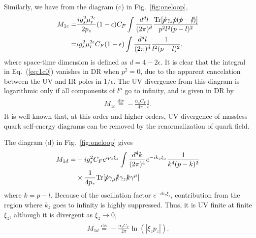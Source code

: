 Similarly, we have from the diagram (c) in Fig.~\ref{fig:oneloop},
\begin{align}\label{eq:1c0}
\begin{split}
M_{1c}=&\frac{i g_s^2 \mu_r^{2\epsilon}}{2p_z}(1-\epsilon)C_F\int\frac{d^dl}{(2\pi)^d} \frac{\text{Tr}[\slashed{p}\gamma_z {\slashed{p}}(\slashed{p}-\slashed{l})]}{p^2l^2(p-l)^2}\\
=&i g_s^2 \mu_r^{2\epsilon} C_F(1-\epsilon)\int\frac{d^dl}{(2\pi)^d} \frac{1}{l^2(p-l)^2},
\end{split}
\end{align}
where space-time dimension is defined as $d=4-2\epsilon$. It is clear that the integral in Eq.~(\ref{eq:1c0}) vanishes in DR when $p^2=0$, due to the apparent cancelation between the UV and IR poles in $1/\epsilon$.  The UV divergence from this diagram is logarithmic only if all components of $l^\mu$ go to infinity, and is given in DR by
\begin{align}\label{eq:1c}
\begin{split}
M_{1c}\overset{\text{div}}{=}-\frac{\alpha_s C_F}{4\pi} \frac{1}{\epsilon}.
\end{split}
\end{align}
It is well-known that, at this order and higher orders, UV divergence of massless quark self-energy diagrams can be removed by the renormalization of quark field.

The diagram (d) in Fig.~\ref{fig:oneloop} gives
\begin{align}
\begin{split}\label{eq:1d0}
M_{1d}=& -i g_s^2C_F e^{i p_z\xi_z} \int \frac{d^4k}{(2\pi)^4} e^{-ik_z \xi_z} \frac{1}{k^4 (p-k)^2} \\
&\times \frac{1}{4p_z } \text{Tr}[\slashed{p}\gamma_\mu\slashed{k}\gamma_z\slashed{k}\gamma^\mu]
\end{split}
\end{align}
where $k=p-l$.
Because of the oscillation factor $e^{-ik_z \xi_z}$, contribution from the region where $k_z$ goes to infinity is highly suppressed. Thus, it is UV finite at finite $\xi_z$, although it is divergent as $\xi_z \to 0$,
\begin{align}\label{eq:1d}
\begin{split}
M_{1d}\overset{\text{div}}{=}-\frac{\alpha_s C_F}{2\pi} \ln(|\xi_zp_z|).
\end{split}
\end{align}

